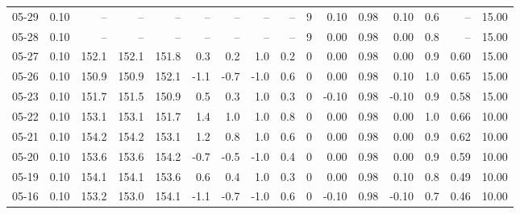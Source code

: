 \begin{threeparttable}
{\begin{tabular}{lrrrrrrrrrrrrrrr}
  05-29 &     0.10 &    -- &    -- &    -- &         -- &             -- &                       -- &                  -- &              9 &       0.10 &      0.98 &           0.10 &              0.6 &              -- &                  15.00 \\
  05-28 &     0.10 &    -- &    -- &    -- &         -- &             -- &                       -- &                  -- &              9 &       0.00 &      0.98 &           0.00 &              0.8 &              -- &                  15.00 \\
  05-27 &     0.10 & 152.1 & 152.1 & 151.8 &        0.3 &            0.2 &                      1.0 &                 0.2 &              0 &       0.00 &      0.98 &           0.00 &              0.9 &            0.60 &                  15.00 \\
  05-26 &     0.10 & 150.9 & 150.9 & 152.1 &       -1.1 &           -0.7 &                     -1.0 &                 0.6 &              0 &       0.00 &      0.98 &           0.10 &              1.0 &            0.65 &                  15.00 \\
  05-23 &     0.10 & 151.7 & 151.5 & 150.9 &        0.5 &            0.3 &                      1.0 &                 0.3 &              0 &      -0.10 &      0.98 &          -0.10 &              0.9 &            0.58 &                  15.00 \\
  05-22 &     0.10 & 153.1 & 153.1 & 151.7 &        1.4 &            1.0 &                      1.0 &                 0.8 &              0 &       0.00 &      0.98 &           0.00 &              1.0 &            0.66 &                  10.00 \\
  05-21 &     0.10 & 154.2 & 154.2 & 153.1 &        1.2 &            0.8 &                      1.0 &                 0.6 &              0 &       0.00 &      0.98 &           0.00 &              0.9 &            0.62 &                  10.00 \\
  05-20 &     0.10 & 153.6 & 153.6 & 154.2 &       -0.7 &           -0.5 &                     -1.0 &                 0.4 &              0 &       0.00 &      0.98 &           0.00 &              0.9 &            0.59 &                  10.00 \\
  05-19 &     0.10 & 154.1 & 154.1 & 153.6 &        0.6 &            0.4 &                      1.0 &                 0.3 &              0 &       0.00 &      0.98 &           0.10 &              0.8 &            0.49 &                  10.00 \\
  05-16 &     0.10 & 153.2 & 153.0 & 154.1 &       -1.1 &           -0.7 &                     -1.0 &                 0.6 &              0 &      -0.10 &      0.98 &          -0.10 &              0.7 &            0.46 &                  10.00 \\

\end{tabular}}
\end{threeparttable}
